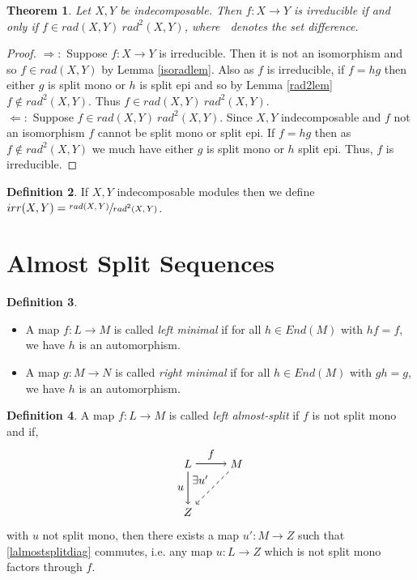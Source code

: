 \documentclass[11.5pt, twoside, a4paper, titlepage]{report}
\theoremstyle{definition}
\newtheorem{mydef}{Definition}[section]
\theoremstyle{plain}
\newtheorem{thm}[mydef]{Theorem}
\begin{document}
\begin{thm}
Let $X,Y$ be indecomposable. Then $f: X \to Y$ is irreducible if and only if $f \in rad(X,Y)\ rad^2(X,Y)$, where $\ $ denotes the set difference.
\end{thm}
\begin{proof}
$\Rightarrow:$ Suppose $f: X \to Y$ is irreducible. Then it is not an isomorphism and so $f\in rad(X,Y)$ by Lemma \ref{isoradlem}. Also as $f$ is irreducible, if $f=hg$ then either $g$ is split mono or $h$ is split epi and so by Lemma \ref{rad2lem} $f\notin rad^2(X,Y)$. Thus $f\in rad(X,Y)\ rad^2(X,Y)$.\\
$\Leftarrow:$ Suppose $f\in rad(X,Y)\ rad^2(X,Y)$. Since $X,Y$ indecomposable and $f$ not an isomorphism $f$ cannot be split mono or split epi. If $f=hg$ then as $f\notin rad^2(X,Y)$ we much have either $g$ is split mono or $h$ split epi. Thus, $f$ is irreducible.
\end{proof}

\begin{mydef}
If $X,Y$ indecomposable modules then we define $irr(X,Y)=\sfrac{rad(X,Y)}{rad^2(X,Y)}$.
\end{mydef}

\section{Almost Split Sequences}

\begin{mydef}
\begin{itemize}
\item A map $f: L \to M$ is called \emph{left minimal} if for all $h\in End(M)$ with $hf=f$, we have $h$ is an automorphism.
\item A map $g: M \to N$ is called \emph{right minimal} if for all $h\in End(M)$ with $gh=g$, we have $h$ is an automorphism.
\end{itemize}
\end{mydef}

\begin{mydef}
A map $f: L \to M$ is called \emph{left almost-split} if $f$ is not split mono and if,
\begin{equation} \label{lalmostsplitdiag}
\begin{tikzpicture}[->,-latex, auto, main path/.style={->, semithick}, main node/.style={}]
\node	[main node]		(1) at (0,0)		{$L$};
\node [main node]		(2) at (1.5,0)	{$M$};
\node [main node]		(3) at (0,-1.5)	{$Z$};

\draw (1) [main path] edge node [auto] {$f$} (2);
\draw (1) [main path] edge node [auto, swap] {$u$} (3);
\draw (2) [->, dashed, semithick] edge node [auto, swap] {$\exists u'$} (3);
\end{tikzpicture}
\end{equation}
with $u$ not split mono, then there exists a map $u': M \to Z$ such that \ref{lalmostsplitdiag} commutes, i.e. any map $u: L \to Z$ which is not split mono factors through $f$.
\end{mydef}
\end{document}
